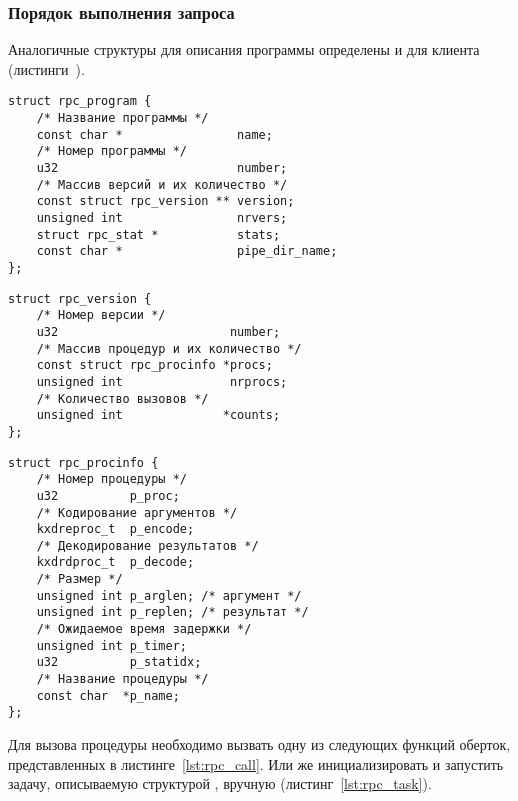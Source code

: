 \subsubsection{Порядок выполнения запроса}

Аналогичные структуры для описания программы определены и для клиента
(листинги~).

\clearpage

\begin{lstlisting}[caption={Структура программы}, label={lst:struct_rpc_program}]
struct rpc_program {
    /* Название программы */
    const char *                name;
    /* Номер программы */
    u32                         number;
    /* Массив версий и их количество */
    const struct rpc_version ** version;
    unsigned int                nrvers;
    struct rpc_stat *           stats;
    const char *                pipe_dir_name;
};
\end{lstlisting}

\begin{lstlisting}[caption={Структура версии}, label={lst:struct_rpc_version}]
struct rpc_version {
    /* Номер версии */
    u32                        number;
    /* Массив процедур и их количество */
    const struct rpc_procinfo *procs;
    unsigned int               nrprocs;
    /* Количество вызовов */
    unsigned int              *counts;
};
\end{lstlisting}

\begin{lstlisting}[caption={Структура процедуры}, label={lst:struct_rpc_procedure}]
struct rpc_procinfo {
    /* Номер процедуры */
    u32          p_proc;
    /* Кодирование аргументов */
    kxdreproc_t  p_encode;
    /* Декодирование результатов */
    kxdrdproc_t  p_decode;
    /* Размер */
    unsigned int p_arglen; /* аргумент */
    unsigned int p_replen; /* результат */
    /* Ожидаемое время задержки */
    unsigned int p_timer;
    u32          p_statidx;
    /* Название процедуры */
    const char  *p_name;
};
\end{lstlisting}

Для вызова процедуры необходимо вызвать одну из следующих функций оберток,
представленных в листинге~\ref{lst:rpc_call}. Или же инициализировать и
запустить задачу, описываемую структурой , вручную
(листинг~\ref{lst:rpc_task}).

